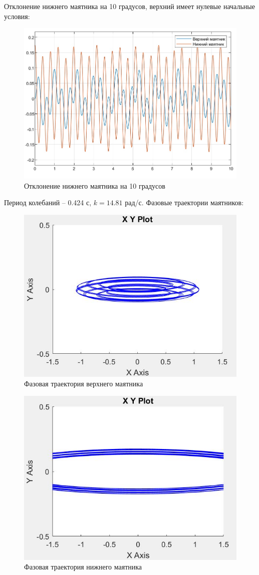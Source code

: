 \documentclass{article}
\begin{document}
	Отклонение нижнего маятника на 10 градусов, верхний имеет нулевые начальные условия:
	\begin{figure}[H]
		\centering
		\includegraphics[width=0.7\linewidth]{down10}
		\caption{Отклонение нижнего маятника на 10 градусов}
		\label{fig:down10}
	\end{figure}
	Период колебаний -- 0.424 с, $k = 14.81$ рад/с.
	Фазовые траектории маятников:
	\begin{figure}[H]
		\centering
		\includegraphics[width=0.7\linewidth]{upper0_10}
		\caption{Фазовая траектория верхнего маятника}
		\label{fig:upper010}
	\end{figure}
	\begin{figure}[H]
		\centering
		\includegraphics[width=0.7\linewidth]{lower10_0}
		\caption{Фазовая траектория нижнего маятника}
		\label{fig:lower100}
	\end{figure}
\end{document}
